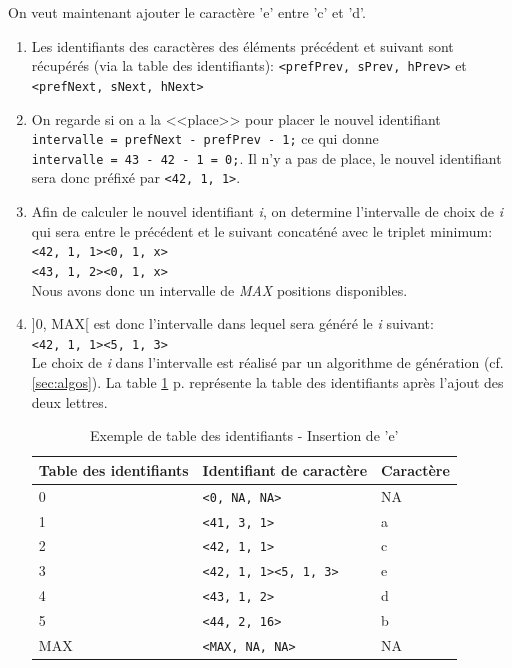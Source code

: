 		On veut maintenant ajouter le caractère 'e' entre 'c' et 'd'.
		\begin{enumerate}
			\item Les identifiants des caractères des éléments précédent et
			suivant sont récupérés (via la table des identifiants):
			\verb+<prefPrev, sPrev, hPrev>+ et \verb+<prefNext, sNext, hNext>+
			\item On regarde si on a la <<place>> pour placer le nouvel
			identifiant\\ \verb+intervalle = prefNext - prefPrev - 1;+ ce qui
			donne \\
			\verb+intervalle = 43 - 42 - 1 = 0;+. Il n'y a pas de place, le
			nouvel identifiant sera donc préfixé par \verb+<42, 1, 1>+.
			\item Afin de calculer le nouvel identifiant \emph{i}, on determine
			l'intervalle de choix de \emph{i} qui sera entre le précédent et le
			suivant concaténé avec le triplet minimum:\\
			\verb+<42, 1, 1><0, 1, x>+\\ 
			\verb+<43, 1, 2><0, 1, x>+\\
			Nous avons donc un intervalle de \emph{MAX} positions disponibles.
			\item ]0, MAX[ est donc l'intervalle dans lequel sera généré le
			\emph{i} suivant:\\
			\verb+<42, 1, 1><5, 1, 3>+\\
			Le choix de \emph{i} dans l'intervalle est réalisé par un algorithme
			de génération (cf. \ref{sec:algos}).
			La table \ref{tab:tableID_e} p.\pageref{tab:tableID_e} représente la
			table des identifiants après l'ajout des deux lettres.
				
		\begin{table}
			\center
			\begin{tabular}{|l|l|l|}			
			\hline
				Table des identifiants & Identifiant de caractère & Caractère\\
			\hline
				0 & \verb+<0, NA, NA>+ & NA\\
				1 & \verb+<41, 3, 1>+ & a\\
				2 & \verb+<42, 1, 1>+ & c\\
				3 & \verb+<42, 1, 1><5, 1, 3>+ & e\\
				4 & \verb+<43, 1, 2>+ & d\\
				5 & \verb+<44, 2, 16>+ & b\\
				MAX & \verb+<MAX, NA, NA>+ & NA\\
			\hline
			\end{tabular}
			\caption{Exemple de table des identifiants - Insertion de 'e'}
			\label{tab:tableID_e}
		\end{table} 
		\end{enumerate}~
		
